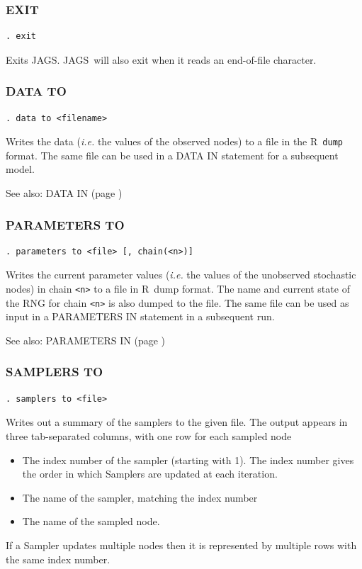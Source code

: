 \documentclass[11pt, a4paper, titlepage]{report}
\newcommand{\JAGS}{\textsf{JAGS}}
\newcommand{\R}{\textsf{R}}
\begin{document}
\subsubsection{EXIT}

\begin{verbatim}
. exit
\end{verbatim}
Exits \JAGS. \JAGS\ will also exit when it reads an end-of-file character.

\subsubsection{DATA TO}
\label{data:to}
\begin{verbatim}
. data to <filename>
\end{verbatim}
Writes the data ({\em i.e.} the values of the observed nodes) to a
file in the \R\ \texttt{dump} format. The same file can be used in a
DATA IN statement for a subsequent model.

See also: DATA IN (page \pageref{data:in})

\subsubsection{PARAMETERS TO}
\label{parameters:to}
\begin{verbatim}
. parameters to <file> [, chain(<n>)]
\end{verbatim}
Writes the current parameter values ({\em i.e.} the values of the
unobserved stochastic nodes) in chain \texttt{<n>} to a file in \R\ dump
format. The name and current state of the RNG for chain \texttt{<n>}
is also dumped to the file.  The same file can be used as input in a
PARAMETERS IN statement in a subsequent run.

See also: PARAMETERS IN (page \pageref{parameters:in})

\subsubsection{SAMPLERS TO}
\label{samplers:to}
\begin{verbatim}
. samplers to <file>
\end{verbatim}
Writes out a summary of the samplers to the given file.  The output appears
in three tab-separated columns, with one row for each sampled node
\begin{itemize}
\item The index number of the sampler (starting with 1). The index number 
gives the order in which Samplers are updated at each iteration.
\item The name of the sampler, matching the index number
\item The name of the sampled node. 
\end{itemize}
If a Sampler updates multiple nodes then it is represented by multiple rows
with the same index number.
\end{document}
